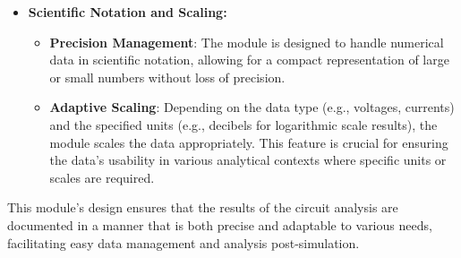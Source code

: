 \documentclass[conference]{IEEEtran}
\begin{document}
\begin{itemize}
  \item \textbf{Scientific Notation and Scaling:}
        \begin{itemize}
          \item \textbf{Precision Management}: The module is designed to handle numerical data in scientific notation, allowing for a
                compact representation of large or small numbers without loss of precision.
          \item \textbf{Adaptive Scaling}: Depending on the data type (e.g., voltages, currents) and the specified units (e.g., decibels
                for logarithmic scale results), the module scales the data appropriately. This feature is crucial for ensuring the data's
                usability in various analytical contexts where specific units or scales are required.
        \end{itemize}
\end{itemize}

This module's design ensures that the results of the circuit analysis are documented in a manner that is both precise and adaptable to
various needs, facilitating easy data management and analysis post-simulation.
\end{document}
